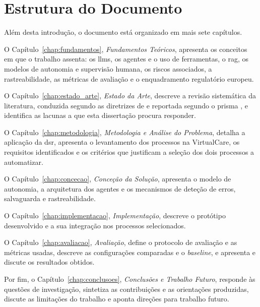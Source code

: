 \section{Estrutura do Documento}
\label{sec:introducao_estrutura}

Além desta introdução, o documento está organizado em mais sete capítulos.

O Capítulo~\ref{chap:fundamentos}, \textit{Fundamentos Teóricos}, apresenta os conceitos em que o trabalho assenta: os \glspl{llm}, os agentes e o uso de ferramentas, o \gls{rag}, os modelos de autonomia e supervisão humana, os riscos associados, a rastreabilidade, as métricas de avaliação e o enquadramento regulatório europeu.

O Capítulo~\ref{chap:estado_arte}, \textit{Estado da Arte}, descreve a revisão sistemática da literatura, conduzida segundo as diretrizes de \textcite{kitchenham2007guidelines} e reportada segundo o \gls{prisma} \parencite{page2021prisma}, e identifica as lacunas a que esta dissertação procura responder.

O Capítulo~\ref{chap:metodologia}, \textit{Metodologia e Análise do Problema}, detalha a aplicação da \gls{dsr}, apresenta o levantamento dos processos na VirtualCare, os requisitos identificados e os critérios que justificam a seleção dos dois processos a automatizar.

O Capítulo~\ref{chap:concecao}, \textit{Conceção da Solução}, apresenta o modelo de autonomia, a arquitetura dos agentes e os mecanismos de deteção de erros, salvaguarda e rastreabilidade.

O Capítulo~\ref{chap:implementacao}, \textit{Implementação}, descreve o protótipo desenvolvido e a sua integração nos processos selecionados.

O Capítulo~\ref{chap:avaliacao}, \textit{Avaliação}, define o protocolo de avaliação e as métricas usadas, descreve as configurações comparadas e o \textit{baseline}, e apresenta e discute os resultados obtidos.

Por fim, o Capítulo~\ref{chap:conclusoes}, \textit{Conclusões e Trabalho Futuro}, responde às questões de investigação, sintetiza as contribuições e as orientações produzidas, discute as limitações do trabalho e aponta direções para trabalho futuro.
